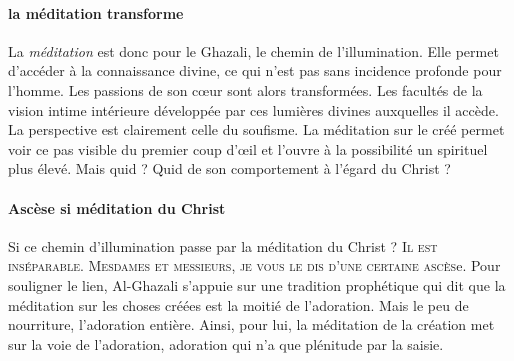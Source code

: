 \paragraph{la méditation transforme}La \textit{méditation} est donc pour le Ghazali, le chemin de l'illumination. Elle permet d'accéder à la connaissance divine, ce qui n'est pas sans incidence profonde pour l'homme.
Les passions de son cœur sont alors transformées. Les facultés de la vision intime intérieure développée par ces lumières divines auxquelles il accède. La perspective est clairement celle du soufisme. La méditation sur le créé permet voir ce pas visible du premier coup d'œil et l'ouvre à la possibilité un spirituel plus élevé. Mais quid ? Quid de son comportement à l'égard du Christ ?

\paragraph{Ascèse si méditation du Christ}
Si ce chemin d'illumination passe par la méditation du Christ ?\textsc{ Il est inséparable. Mesdames et messieurs, je vous le dis  d'une certaine ascès}e. Pour souligner le lien, Al-Ghazali s'appuie sur une tradition prophétique qui dit que la méditation sur les choses créées est la moitié de l'adoration. Mais le peu de nourriture, l'adoration entière. Ainsi, pour lui, la méditation de la création met sur la voie de l'adoration, adoration qui n'a que plénitude par la saisie.


